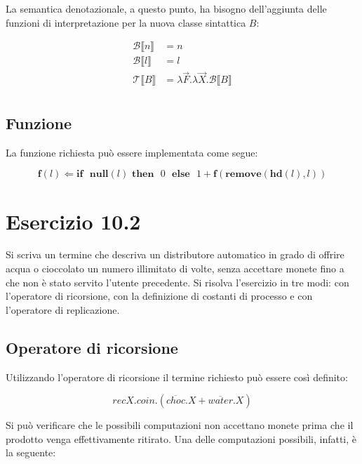 		La semantica denotazionale, a questo punto, ha bisogno dell'aggiunta delle funzioni di interpretazione per la nuova classe sintattica $B$:
		
		\begin{align*}
		\mathcal{B} \llbracket n \rrbracket & = n\\
		\mathcal{B} \llbracket l \rrbracket & = l\\
		\mathcal{T} \llbracket B \rrbracket & = \lambda \overrightarrow{F}.\lambda \overrightarrow{X}.\mathcal{B} \llbracket B \rrbracket\\		
		\end{align*}
		
		\subsection{Funzione}
		La funzione richiesta può essere implementata come segue:
		
		$$\textbf{f}(l) \Leftarrow \textbf{if}\text{ }\textbf{null}(l)\text{
		}\textbf{then}\text{ }0\text{ }\textbf{else}\text{ }1 +
		\textbf{f}(\textbf{remove}(\textbf{hd}(l),l))$$
		
		\newpage
		
	\section{Esercizio 10.2}
		Si scriva un termine che descriva un distributore automatico in grado
		di offrire acqua o cioccolato un numero illimitato di volte, senza accettare
		monete fino a che non è stato servito l'utente precedente. Si risolva
		l'esercizio in tre modi: con l'operatore di ricorsione, con la definizione di
		costanti di processo e con l'operatore di replicazione.
		
		\sectionline
		
		\subsection{Operatore di ricorsione}
		
		Utilizzando l'operatore di ricorsione il termine richiesto può essere così definito:
		
		$$recX.coin.(\overline{choc}.X + \overline{water}.X)$$
		
		Si può verificare che le possibili computazioni non accettano monete prima che il prodotto venga effettivamente ritirato. Una delle computazioni possibili, infatti, è la seguente:
		
